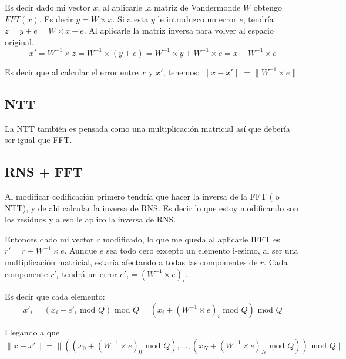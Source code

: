 \documentclass[12pt, oneside]{article}
\begin{document}
Es decir dado mi vector $x$, al aplicarle la matriz de Vandermonde $W$ obtengo $FFT(x)$.
Es decir $ y = W \times x$.
Si a esta $y$ le introduzco un error $e$, tendría $z = y + e = W\times x + e$.
Al aplicarle la matriz inversa para volver al espacio original.
\begin{equation*}
    x' = W^{-1}\times z = W^{-1}\times (y+e) = W^{-1}\times y + W^{-1}\times e = x + W^{-1}\times e
\end{equation*}

Es decir que al calcular el error entre $x$ y $x'$, tenemos:
$\lVert x-x' \rVert = \lVert W^{-1} \times e \rVert$

\subsection {NTT}
La NTT también es pensada como una multiplicación matricial así que debería  ser igual que FFT.

\subsection{RNS + FFT}
Al modificar codificación primero tendría que hacer la inversa de la FFT ( o NTT), y de ahi calcular la
inversa de RNS.
Es decir lo que estoy modificando son los residuos y a eso le aplico la inversa de RNS.

Entonces dado mi vector $r$ modificado, lo que me queda al aplicarle IFFT es  $r' = r + W^{-1}\times e$.
Aunque $e$ sea todo cero excepto un elemento i-esimo, al ser una multiplicación matricial,
estaría afectando a todas las componentes de $r$.
Cada componente $r'_i$ tendrá un error $e'_i = (W^{-1}\times e)_i$.

Es decir que cada elemento:
\begin{equation}
    x'_i = (x_i + e'_i \text{ mod } Q) \text{ mod } Q = (x_i + (W^{-1}\times e)_i \text{ mod } Q) \text{ mod } Q
\end{equation}

Llegando a que
\begin{equation}
    \lVert x - x' \rVert  = \lVert  ((x_0 + (W^{-1}\times e)_0 \text{ mod } Q), ..., (x_N + (W^{-1}\times e)_N \text{ mod } Q)) \text{ mod } Q\rVert
\end{equation}
\end{document}
